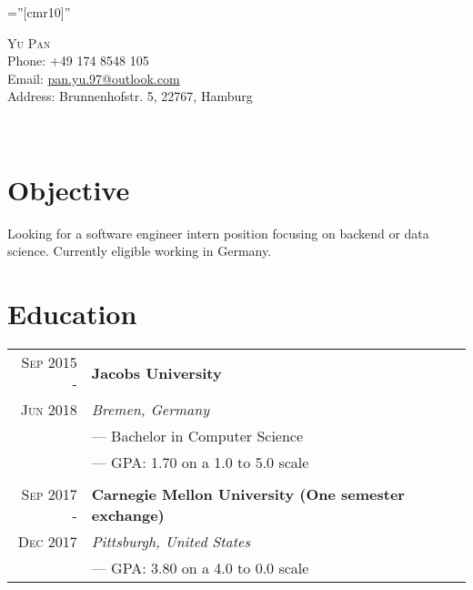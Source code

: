 \documentclass[a4paper,10pt]{article}
\begin{document}
	
	
	\pagestyle{empty} %
	
	\font\fb=''[cmr10]'' %
	
	\par{\centering
		{\huge{\textsc{Yu Pan}}}\\
		Phone: +49 174 8548 105  \\ Email: \href{mailto:pan.yu.97@outlook.com}{pan.yu.97@outlook.com}\\
		Address: Brunnenhofstr. 5, 22767, Hamburg \par}\\
	
	\section{Objective}
	Looking for a software engineer intern position focusing on backend or data science. Currently eligible working in Germany.
	\section{Education}
	\begin{tabular}{r|l}
	    \textsc{Sep 2015 - } & \textbf{Jacobs University} \\\textsc{Jun 2018}&\emph{Bremen, Germany}
		\\& --- Bachelor in Computer Science
		\\& --- GPA: 1.70 on a 1.0 to 5.0 scale
		\\ \multicolumn{1}{c}{} \\
	    \textsc{Sep 2017 - } & \textbf{Carnegie Mellon University (One semester exchange)} \\\textsc{Dec 2017}&\emph{Pittsburgh, United States}
		\\& --- GPA: 3.80 on a 4.0 to 0.0 scale
	\end{tabular}
	
\end{document}
